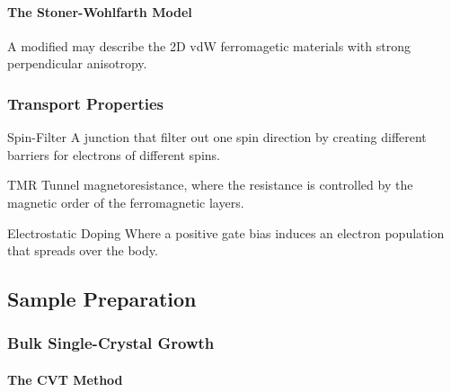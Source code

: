 \documentclass[hidelinks]{article}
\begin{document}

\paragraph{The Stoner-Wohlfarth Model} %
\label{par:the_stoner_wohlfarth_model}

A modified  may describe the 2D vdW ferromagetic materials with strong perpendicular anisotropy.



\subsubsection{Transport Properties} %
\label{ssub:transport_properties}

\begin{termdef}{Spin-Filter}
    A junction that filter out one spin direction by creating different barriers for electrons of different spins.
\end{termdef}
\begin{termdef}{TMR}
    Tunnel magnetoresistance, where the resistance is controlled by the magnetic order of the ferromagnetic layers.
\end{termdef}
\begin{termdef}{Electrostatic Doping}
    Where a positive gate bias induces an electron population that spreads over the body.
\end{termdef}



\subsection{Sample Preparation} %
\label{sub:sample_preparation}

\subsubsection{Bulk Single-Crystal Growth} %
\label{ssub:bulk_single_crystal_growth}

\paragraph{The CVT Method} %
\label{par:the_cvt_method}
\end{document}
